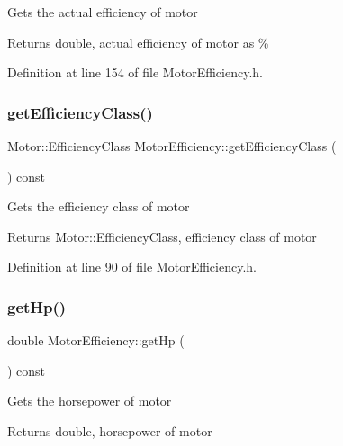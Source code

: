 Gets the actual efficiency of motor \begin{DoxyReturn}{Returns}
double, actual efficiency of motor as \% 
\end{DoxyReturn}


Definition at line 154 of file Motor\+Efficiency.\+h.

\mbox{\label{class_motor_efficiency_a9eb7d5c2fc598f655c1a3d12790e4d17}} 
\subsubsection{\texorpdfstring{get\+Efficiency\+Class()}{getEfficiencyClass()}}
{\footnotesize\ttfamily Motor\+::\+Efficiency\+Class Motor\+Efficiency\+::get\+Efficiency\+Class (\begin{DoxyParamCaption}{ }\end{DoxyParamCaption}) const\hspace{0.3cm}{\ttfamily [inline]}}

Gets the efficiency class of motor \begin{DoxyReturn}{Returns}
Motor\+::\+Efficiency\+Class, efficiency class of motor 
\end{DoxyReturn}


Definition at line 90 of file Motor\+Efficiency.\+h.

\mbox{\label{class_motor_efficiency_a9f88159c82daa270975d7969debe88a9}} 
\subsubsection{\texorpdfstring{get\+Hp()}{getHp()}}
{\footnotesize\ttfamily double Motor\+Efficiency\+::get\+Hp (\begin{DoxyParamCaption}{ }\end{DoxyParamCaption}) const\hspace{0.3cm}{\ttfamily [inline]}}

Gets the horsepower of motor \begin{DoxyReturn}{Returns}
double, horsepower of motor 
\end{DoxyReturn}


